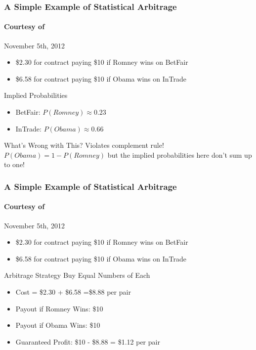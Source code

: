 \documentclass{beamer}
\begin{document}
\begin{frame}
\frametitle{A Simple Example of Statistical Arbitrage}
\framesubtitle{Courtesy of  }

\begin{block}{November 5th, 2012}
	\begin{itemize}
		\item\$2.30 for contract paying \$10 if Romney wins on BetFair
		\item \$6.58 for contract paying \$10 if Obama wins on InTrade
	\end{itemize}
\end{block}

\begin{block}{Implied Probabilities}
	\begin{itemize}
	\item BetFair: $P(Romney) \approx 0.23$
	\item InTrade: $P(Obama) \approx 0.66$
	\end{itemize}
\end{block}

\begin{alertblock}{What's Wrong with This?}\pause
 Violates complement rule! $P(Obama) = 1 - P(Romney)$ but the implied probabilities here don't sum up to one!
\end{alertblock}



\end{frame}

\begin{frame}
\frametitle{A Simple Example of Statistical Arbitrage}
\framesubtitle{Courtesy of  }

\begin{block}{November 5th, 2012}
	\begin{itemize}
		\item\$2.30 for contract paying \$10 if Romney wins on BetFair
		\item \$6.58 for contract paying \$10 if Obama wins on InTrade
	\end{itemize}
\end{block}

\begin{alertblock}{Arbitrage Strategy}
Buy Equal Numbers of Each 
	\begin{itemize}
		\item Cost = \$2.30 + \$6.58 =\$8.88 per pair 
		\item Payout if Romney Wins: \$10 
		\item Payout if Obama Wins: \$10
		\item Guaranteed Profit: \$10 - \$8.88 = \$1.12 per pair
	\end{itemize} 

\end{alertblock}



\end{frame}
\end{document}

